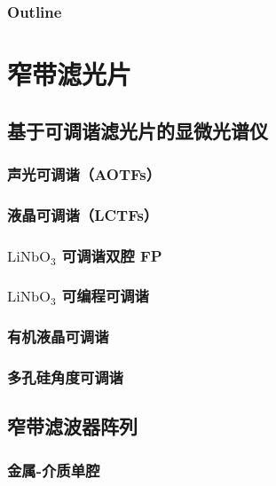 \documentclass[9 pt,makeindex]{beamer}
\begin{document}
\frame{\titlepage}

\begin{frame}
    \frametitle{Outline}
    \tableofcontents
\end{frame}

\section{窄带滤光片}

\subsection{基于可调谐滤光片的显微光谱仪}
\subsubsection{声光可调谐（AOTFs）}

\subsubsection{液晶可调谐（LCTFs）}
\subsubsection{$\mathrm{LiNbO}_3$ 可调谐双腔 FP}

\subsubsection{$\mathrm{LiNbO}_3$ 可编程可调谐}

\subsubsection{有机液晶可调谐}

\subsubsection{多孔硅角度可调谐}



\subsection{窄带滤波器阵列}
\subsubsection{金属-介质单腔}

\end{document}
